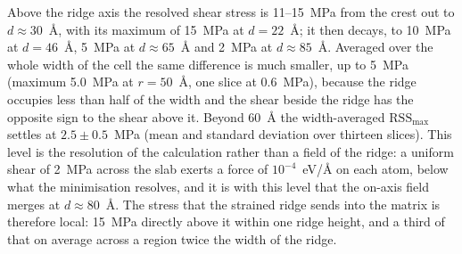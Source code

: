 Above the ridge axis the resolved shear stress is 11--15~MPa from the crest
out to $d\approx30$~\AA{}, with its maximum of 15~MPa at $d=22$~\AA{}; it
then decays, to 10~MPa at $d=46$~\AA{}, 5~MPa at $d\approx65$~\AA{} and
2~MPa at $d\approx85$~\AA{}. Averaged over the whole width of the cell the
same difference is much smaller, up to 5~MPa (maximum 5.0~MPa at
$r=50$~\AA{}, one slice at 0.6~MPa), because the ridge occupies less than half of the width and
the shear beside the ridge has the opposite sign to the shear above it.
Beyond 60~\AA{} the width-averaged $\mathrm{RSS}_{\max}$ settles at
$2.5\pm0.5$~MPa (mean and standard deviation over thirteen slices). This
level is the resolution of the calculation rather than a field of the
ridge: a uniform shear of 2~MPa across the slab exerts a force of
$10^{-4}$~eV/\AA{} on each atom, below what the minimisation resolves, and
it is with this level that the on-axis field merges at $d\approx80$~\AA{}.
The stress that the strained ridge sends into the matrix is therefore
local: 15~MPa directly above it within one ridge height, and a third of
that on average across a region twice the width of the ridge.

